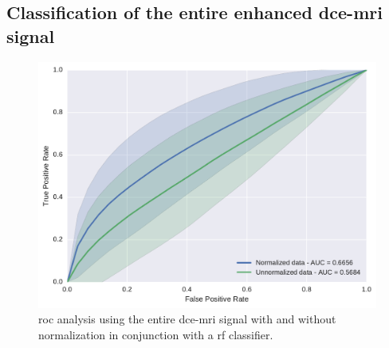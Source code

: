 

\subsection{Classification of the entire enhanced \acs*{dce}-\acs*{mri} signal}

\begin{figure}
  \centering
  \includegraphics[width=0.7\linewidth]{03_experiments/figures/rf.pdf}
  \caption{\acs*{roc} analysis using the entire \ac{dce}-\ac{mri} signal with and without normalization in conjunction with a \acs*{rf} classifier.}
  \label{fig:rfnormdcesignal}
\end{figure}

